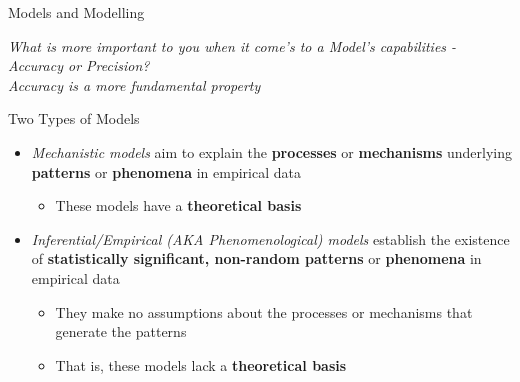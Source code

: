 \documentclass[xcolor=x11names,compress, handout]{beamer}
\renewcommand{\(}{\begin{columns}}
\renewcommand{\)}{\end{columns}}
\newcommand{\<}[1]{\begin{column}{#1}}
\renewcommand{\>}{\end{column}}
\begin{document}
\begin{frame}{Models and Modelling}

	\begin{center}

		\it What is more important to you when it come's to a Model's capabilities - Accuracy or Precision?\\
		\vspace{20pt}
		\pause 
		Accuracy is a more fundamental property
		
	  \end{center}
 
 \end{frame}

\begin{frame}{Two Types of Models}

	\begin{itemize}[<+->]\itemsep20pt

		\item {\it Mechanistic models} aim to explain the \textbf{processes} or \textbf{mechanisms} underlying \textbf{patterns} or \textbf{phenomena} in empirical data 
		\begin{itemize}
			\item These models have a \textbf{theoretical basis}
		\end{itemize}
 
		\item {\it Inferential/Empirical (AKA Phenomenological) models} establish the existence of
		\textbf{statistically significant, non-random patterns} or \textbf{phenomena} in empirical
		data
		\begin{itemize}
			\item They make no assumptions about the processes or mechanisms that generate the patterns
			\item That is, these models lack a \textbf{theoretical basis}
		\end{itemize}
			
	  \end{itemize}
 
 \end{frame}
 
\end{document}
